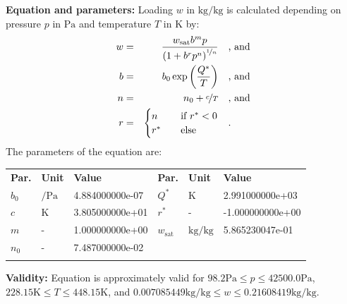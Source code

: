 \textbf{Equation and parameters:}
\newline
%
Loading $w$ in $\si{\kilogram\per\kilogram}$ is calculated depending on pressure $p$ in $\si{\pascal}$ and temperature $T$ in $\si{\kelvin}$ by:
%
\begin{equation*}
\begin{split}
w &=& \frac{w_\mathrm{sat} b^{m} p}{\left( 1 + b^{r} p^{n} \right)^{\nicefrac{1}{n}}} & \quad\text{, and} \\
b &=& b_0 \exp\left( \frac{Q^{*}}{T} \right) & \quad\text{, and} \\
n &=& n_0 + \nicefrac{c}{T} & \quad\text{, and} \\
r &=& \begin{cases} n & \quad \text{if } r^{*} < 0 \\ r^{*}  & \quad \text{else} \end{cases} & \quad\text{.}
\end{split}
\end{equation*}
%
The parameters of the equation are:
%
\begin{longtable}[l]{lll|lll}
\toprule
\addlinespace
\textbf{Par.} & \textbf{Unit} & \textbf{Value} &	\textbf{Par.} & \textbf{Unit} & \textbf{Value} \\
\addlinespace
\midrule
\endhead

\bottomrule
\endfoot
\bottomrule
\endlastfoot
\addlinespace

$b_0$ & $\si{\per\pascal}$ & 4.884000000e-07 & $Q^{*}$ & $\si{\kelvin}$ & 2.991000000e+03 \\
$c$ & $\si{\kelvin}$ & 3.805000000e+01 & $r^{*}$ & - & -1.000000000e+00 \\
$m$ & - & 1.000000000e+00 & $w_\mathrm{sat}$ & $\si{\kilogram\per\kilogram}$ & 5.865230047e-01 \\
$n_0$ & - & 7.487000000e-02 & & & \\

\addlinespace\end{longtable}

\textbf{Validity:}
\newline
Equation is approximately valid for $98.2 \si{\pascal} \leq p \leq 42500.0 \si{\pascal}$,  $228.15 \si{\kelvin} \leq T \leq 448.15 \si{\kelvin}$, and $0.007085449 \si{\kilogram\per\kilogram} \leq w \leq 0.21608419 \si{\kilogram\per\kilogram}$.
\newline

